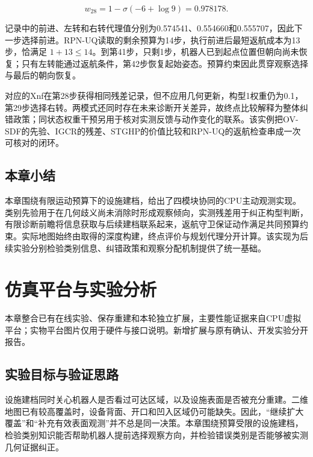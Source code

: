 \documentclass[11pt,a4paper]{article}
\begin{document}
\[
w_{28}=1-\sigma(-6+\log9)=0.978178.
\]

记录中的前进、左转和右转代理值分别为0.574541、0.554660和0.555707，因此下一步选择前进。RPN-UQ读取的剩余预算为14步，执行前进后最短返航成本为13步，恰满足 \(1+13\le14\)。到第41步，只剩1步，机器人已到起点位置但朝向尚未恢复；只有左转能通过返航条件，第42步恢复起始姿态。预算约束因此贯穿观察选择与最后的朝向恢复。

对应的Xnf在第28步获得相同残差记录，但不应用几何更新，构型1权重仍为0.1，第29步选择右转。两模式还同时存在未来诊断开关差异，故终点比较解释为整体纠错政策；同状态权重干预另用于核对实测反馈与动作变化的联系。该实例把OV-SDF的先验、IGCR的残差、STGHP的价值比较和RPN-UQ的返航检查串成一次可核对的闭环。

\hypertarget{ux672cux7ae0ux5c0fux7ed3}{%
\subsection{本章小结}\label{ux672cux7ae0ux5c0fux7ed3}}

本章围绕有限运动预算下的设施建档，给出了四模块协同的CPU主动观测实现。类别先验用于在几何歧义尚未消除时形成观察倾向，实测残差用于纠正构型判断，有限诊断前瞻将信息获取与后续建档联系起来，返航守卫保证动作满足共同预算约束。实际地图始终由取得的深度构建，终点评价与规划代理分开计算。该实现为后续实验分别检验类别信息、纠错政策和观察分配机制提供了统一基础。

\hypertarget{ux4effux771fux5e73ux53f0ux4e0eux5b9eux9a8cux5206ux6790}{%
\clearpage
\section{仿真平台与实验分析}\label{ux4effux771fux5e73ux53f0ux4e0eux5b9eux9a8cux5206ux6790}}

本章整合已有在线实验、保存重建和本轮独立扩展，主要性能证据来自CPU虚拟平台；实物平台图片仅用于硬件与接口说明。新增扩展与原有确认、开发实验分开报告。

\hypertarget{ux5b9eux9a8cux76eeux6807ux4e0eux9a8cux8bc1ux601dux8def}{%
\subsection{实验目标与验证思路}\label{ux5b9eux9a8cux76eeux6807ux4e0eux9a8cux8bc1ux601dux8def}}

设施建档同时关心机器人是否看过可达区域，以及设施表面是否被充分重建。二维地图已有较高覆盖时，设备背面、开口和凹入区域仍可能缺失。因此，``继续扩大覆盖''和``补充有效表面观测''并不总是同一决策。本章围绕预算受限的设施建档，检验类别知识能否帮助机器人提前选择观察方向，并检验错误类别是否能够被实测几何证据纠正。
\end{document}
